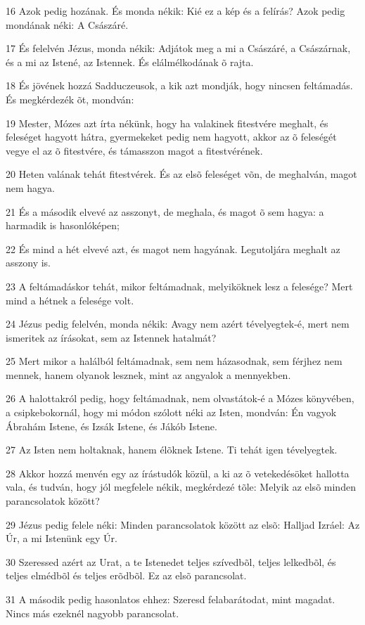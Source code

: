 \par 16 Azok pedig hozának. És monda nékik: Kié ez a kép és a felírás? Azok pedig mondának néki: A Császáré.
\par 17 És felelvén Jézus, monda nékik: Adjátok meg a mi a Császáré, a Császárnak, és a mi az Istené, az Istennek. És elálmélkodának õ rajta.
\par 18 És jövének hozzá Sadduczeusok, a kik azt mondják, hogy nincsen feltámadás. És megkérdezék õt, mondván:
\par 19 Mester, Mózes azt írta nékünk, hogy ha valakinek fitestvére meghalt, és feleséget hagyott hátra, gyermekeket pedig nem hagyott, akkor az õ feleségét vegye el az õ fitestvére, és támasszon magot a fitestvérének.
\par 20 Heten valának tehát fitestvérek. És az elsõ feleséget võn, de meghalván, magot nem hagya.
\par 21 És a második elvevé az asszonyt, de meghala, és magot õ sem hagya: a harmadik is hasonlóképen;
\par 22 És mind a hét elvevé azt, és magot nem hagyának. Legutoljára meghalt az asszony is.
\par 23 A feltámadáskor tehát, mikor feltámadnak, melyiköknek lesz a felesége? Mert mind a hétnek a felesége volt.
\par 24 Jézus pedig felelvén, monda nékik: Avagy nem azért tévelyegtek-é, mert nem ismeritek az írásokat, sem az Istennek hatalmát?
\par 25 Mert mikor a halálból feltámadnak, sem nem házasodnak, sem férjhez nem mennek, hanem olyanok lesznek, mint az angyalok a mennyekben.
\par 26 A halottakról pedig, hogy feltámadnak, nem olvastátok-é a Mózes könyvében, a csipkebokornál, hogy mi módon szólott néki az Isten, mondván: Én vagyok Ábrahám Istene, és Izsák Istene, és Jákób Istene.
\par 27 Az Isten nem holtaknak, hanem élõknek Istene. Ti tehát igen tévelyegtek.
\par 28 Akkor hozzá menvén egy az írástudók közül, a ki az õ vetekedésöket hallotta vala, és tudván, hogy jól megfelele nékik, megkérdezé tõle: Melyik az elsõ minden parancsolatok között?
\par 29 Jézus pedig felele néki: Minden parancsolatok között az elsõ: Halljad Izráel: Az Úr, a mi Istenünk egy Úr.
\par 30 Szeressed azért az Urat, a te Istenedet teljes szívedbõl, teljes lelkedbõl, és teljes elmédbõl és teljes erõdbõl. Ez az elsõ parancsolat.
\par 31 A második pedig hasonlatos ehhez: Szeresd felabarátodat, mint magadat. Nincs más ezeknél nagyobb parancsolat.
